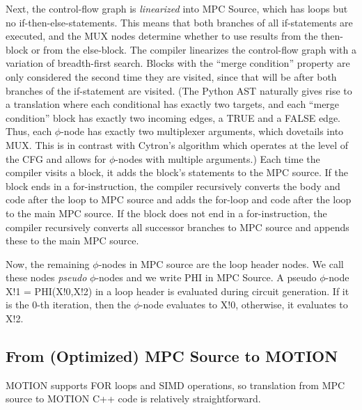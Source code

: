 Next, the control-flow graph is \emph{linearized} into MPC Source,
which has loops but no if-then-else-statements.
This means that both branches of all if-statements are executed,
and the MUX nodes determine whether to use results from the then-block or from the else-block.
The compiler linearizes the control-flow graph with a variation of breadth-first search.
Blocks with the ``merge condition'' property are only considered
the second time they are visited,
since that will be after both branches of the if-statement are visited.
(The Python AST naturally gives rise to a translation where each conditional has exactly two targets,
and each ``merge condition'' block has exactly two incoming edges, a TRUE and a FALSE edge.
Thus, each $\phi$-node has exactly two multiplexer arguments, which dovetails into MUX.
This is in contrast with Cytron's algorithm which operates at the level of the CFG and allows for
$\phi$-nodes with multiple arguments.)
Each time the compiler visits a block,
it adds the block's statements to the MPC source.
If the block ends in a for-instruction,
the compiler recursively converts the body and code after the loop to MPC source
and adds the for-loop and code after the loop to the main MPC source.
If the block does not end in a for-instruction,
the compiler recursively converts all successor branches to MPC source and
appends these to the main MPC source.

Now, the remaining $\phi$-nodes in MPC source are the loop header nodes. We call these nodes \emph{pseudo} $\phi$-nodes
and we write {\sf PHI} in MPC Source. A pseudo $\phi$-node {\sf X!1 = PHI(X!0,X!2)} in a loop header is evaluated
during circuit generation. If it is the 0-th iteration, then the $\phi$-node evaluates to {\sf X!0}, otherwise, it evaluates to {\sf X!2}.



\subsection{From (Optimized) MPC Source to MOTION}
\label{sec:MOTION}

MOTION supports FOR loops and SIMD operations, so translation from MPC source to MOTION C++ code is relatively straightforward.
